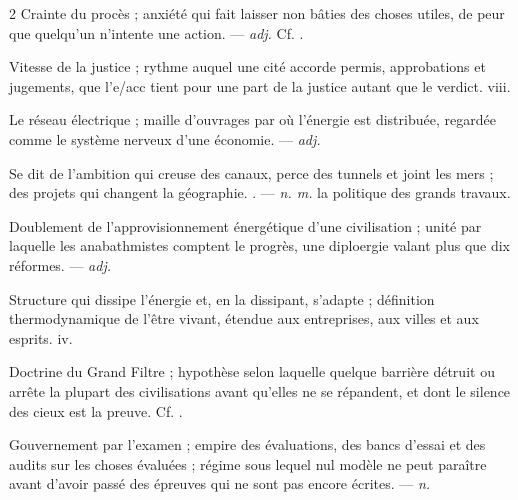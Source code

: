 \begin{multicols}{2}
 Crainte du procès ; anxiété qui fait laisser non bâties des choses utiles, de peur que quelqu'un n'intente une action. —  \textit{adj.} Cf. .

 Vitesse de la justice ; rythme auquel une cité accorde permis, approbations et jugements, que l'e/acc tient pour une part de la justice autant que le verdict.   viii.

 Le réseau électrique ; maille d'ouvrages par où l'énergie est distribuée, regardée comme le système nerveux d'une économie.  —  \textit{adj.}

 Se dit de l'ambition qui creuse des canaux, perce des tunnels et joint les mers ; des projets qui changent la géographie. . —  \textit{n. m.} la politique des grands travaux.

 Doublement de l'approvisionnement énergétique d'une civilisation ; unité par laquelle les anabathmistes comptent le progrès, une diploergie valant plus que dix réformes.  —  \textit{adj.}

 Structure qui dissipe l'énergie et, en la dissipant, s'adapte ; définition thermodynamique de l'être vivant, étendue aux entreprises, aux villes et aux esprits.   iv.

 Doctrine du Grand Filtre ; hypothèse selon laquelle quelque barrière détruit ou arrête la plupart des civilisations avant qu'elles ne se répandent, et dont le silence des cieux est la preuve.  Cf. .

 Gouvernement par l'examen ;  empire des évaluations, des bancs d'essai et des audits sur les choses évaluées ;   régime sous lequel nul modèle ne peut paraître avant d'avoir passé des épreuves qui ne sont pas encore écrites.   —  \textit{n.}


\end{multicols}
